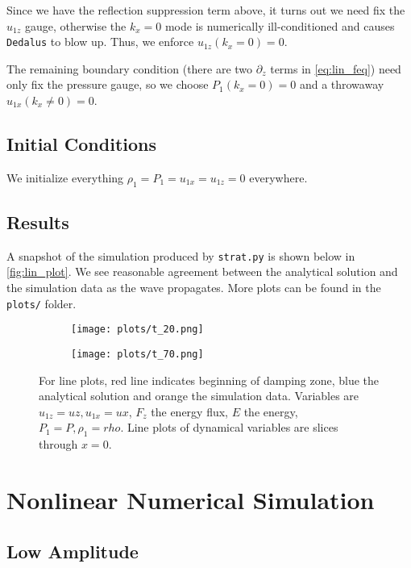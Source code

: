 \documentclass[11pt,
        usenames, %
        dvipsnames %
    ]{article}
\begin{document}
Since we have the reflection suppression term above, it turns out we need fix
the $u_{1z}$ gauge, otherwise the $k_x = 0$ mode is numerically ill-conditioned
and causes \texttt{Dedalus} to blow up. Thus, we enforce $u_{1z}(k_x = 0) = 0$.

The remaining boundary condition (there are two $\partial_z$ terms in
\autoref{eq:lin_feq}) need only fix the pressure gauge, so we choose $P_1(k_x =
0) = 0$ and a throwaway $u_{1x}(k_x \neq 0) = 0$.

\subsection{Initial Conditions}

We initialize everything $\rho_1 = P_1 = u_{1x} = u_{1z} = 0$ everywhere.

\subsection{Results}

A snapshot of the simulation produced by \texttt{strat.py} is shown below in
\autoref{fig:lin_plot}. We see reasonable agreement between the analytical
solution and the simulation data as the wave propagates. More plots can be found
in the \texttt{plots/} folder.
\begin{figure}[t]
    \centering
    \begin{subfigure}{0.7\textwidth}
        \centering
        \texttt{[image: plots/t\_20.png]}
    \end{subfigure}

    \begin{subfigure}{0.7\textwidth}
        \centering
        \texttt{[image: plots/t\_70.png]}
    \end{subfigure}
    \caption{For line plots, red line indicates beginning of damping zone, blue
    the analytical solution and orange the simulation data. Variables are
    $u_{1z} = uz, u_{1x} = ux$, $F_z$ the energy flux, $E$ the energy, $P_1 = P,
    \rho_1 = rho$. Line plots of dynamical variables are slices through $x = 0$.
    }\label{fig:lin_plot}
\end{figure}

\section{Nonlinear Numerical Simulation}

\subsection{Low Amplitude}
\end{document}
